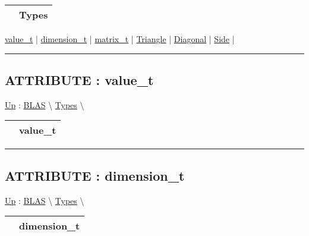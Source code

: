 {\renewcommand{\arraystretch}{1.5}
\begin{tabularx}{\textwidth}{|>{\raggedright\arraybackslash}l|X|}
\hline
\hspace{0pt} & Types \\
\hline
\end{tabularx}
}

\par


\hyperlink{ecldoc:blas.types.value_t}{value\_t}  |
\hyperlink{ecldoc:blas.types.dimension_t}{dimension\_t}  |
\hyperlink{ecldoc:blas.types.matrix_t}{matrix\_t}  |
\hyperlink{ecldoc:ecldoc-Triangle}{Triangle}  |
\hyperlink{ecldoc:ecldoc-Diagonal}{Diagonal}  |
\hyperlink{ecldoc:ecldoc-Side}{Side}  |

\rule{\linewidth}{0.5pt}

\subsection*{ATTRIBUTE : value\_t}
\hypertarget{ecldoc:blas.types.value_t}{}
\hyperlink{ecldoc:BLAS.Types}{Up} :
\hspace{0pt} \hyperlink{ecldoc:BLAS}{BLAS} \textbackslash 
\hspace{0pt} \hyperlink{ecldoc:BLAS.Types}{Types} \textbackslash 

{\renewcommand{\arraystretch}{1.5}
\begin{tabularx}{\textwidth}{|>{\raggedright\arraybackslash}l|X|}
\hline
\hspace{0pt} & value\_t \\
\hline
\end{tabularx}
}

\par


\rule{\linewidth}{0.5pt}
\subsection*{ATTRIBUTE : dimension\_t}
\hypertarget{ecldoc:blas.types.dimension_t}{}
\hyperlink{ecldoc:BLAS.Types}{Up} :
\hspace{0pt} \hyperlink{ecldoc:BLAS}{BLAS} \textbackslash 
\hspace{0pt} \hyperlink{ecldoc:BLAS.Types}{Types} \textbackslash 

{\renewcommand{\arraystretch}{1.5}
\begin{tabularx}{\textwidth}{|>{\raggedright\arraybackslash}l|X|}
\hline
\hspace{0pt} & dimension\_t \\
\hline
\end{tabularx}
}


